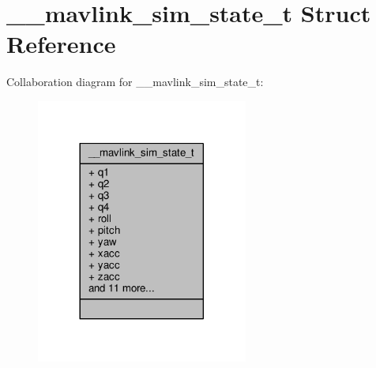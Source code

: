 \hypertarget{struct____mavlink__sim__state__t}{\section{\+\_\+\+\_\+mavlink\+\_\+sim\+\_\+state\+\_\+t Struct Reference}
\label{struct____mavlink__sim__state__t}
}


Collaboration diagram for \+\_\+\+\_\+mavlink\+\_\+sim\+\_\+state\+\_\+t\+:
\nopagebreak
\begin{figure}[H]
\begin{center}
\leavevmode
\includegraphics[width=197pt]{struct____mavlink__sim__state__t__coll__graph}
\end{center}
\end{figure}
